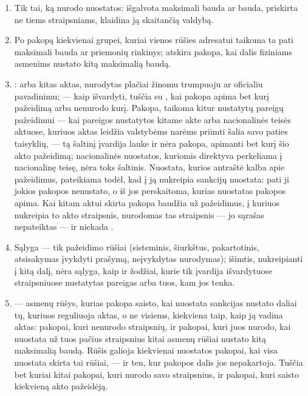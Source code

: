 \begin{enumerate}[itemsep=1pt, topsep=3pt]
  \item Tik tai, ką nurodo nuostatos: išgalvota maksimali bauda ar bauda, priskirta ne tiems
    straipsniams, klaidina ją skaitančią valdybą.
  \item Po pakopą kiekvienai grupei, kuriai vienos rūšies adresatui taikoma ta pati maksimali
    bauda ar priemonių rinkinys; atskira pakopa, kai dalis fiziniams asmenims nustato kitą
    maksimalią baudą.
  \item {}:  arba kitas aktas, nurodytas plačiai žinomu trumpuoju
    ar oficialiu pavadinimu;  --- kaip išvardyti, tuščia su , kai
    pakopa apima bet kurį pažeidimą arba nenurodo kurį. Pakopa, taikoma kitur nustatytų
    pareigų pažeidimui --- kai pareigos nustatytos kitame akte arba nacionalinės teisės aktuose,
    kuriuos aktas leidžia valstybėms narėms priimti šalia savo paties taisyklių, --- tą šaltinį
    įvardija lauke  ir nėra pakopa, apimanti bet kurį šio akto pažeidimą;
    nacionalinės nuostatos, kuriomis direktyva perkeliama į nacionalinę teisę, nėra toks
    šaltinis. Nuostata, kurios antraštė kalba apie pažeidimus, pateikiama todėl, kad į ją
    nukreipia sankcijų nuostata: pati ji jokios pakopos nenustato, o iš jos perskaitoma,
    kurias nuostatas pakopos apima. Kai kitam aktui skirta pakopa baudžia už pažeidimus, į
    kuriuos nukreipia to akto straipsnis, nurodomas tas straipsnis --- jo sąrašas
    nepateiktas --- ir niekada .
  \item Sąlyga --- tik pažeidimo rūšiai (sisteminis, šiurkštus, pakartotinis, atsisakymas
    įvykdyti prašymą, neįvykdytas nurodymas); išimtis, nukreipianti į kitą dalį, nėra sąlyga,
    kaip ir žodžiai, kurie tik įvardija išvardytuose straipsniuose nustatytas pareigas arba
    tuos, kam jos tenka.
  \item {} --- asmenų rūšys, kurias pakopa saisto, kai nuostata sankcijas nustato
    daliai tų, kuriuos reguliuoja aktas, o ne visiems, kiekviena taip, kaip ją vadina aktas:
    pakopai, kuri nenurodo straipsnių, ir pakopai, kuri juos nurodo, kai nuostata už tuos
    pačius straipsnius kitai asmenų rūšiai nustato kitą maksimalią baudą. Rūšis galioja
    kiekvienai nuostatos pakopai, kai visa nuostata skirta tai rūšiai, --- ir ten, kur pakopos
    dalis jos nepakartoja. Tuščia bet kuriai kitai pakopai, kuri nurodo savo straipsnius, ir
    pakopai, kuri saisto kiekvieną akto pažeidėją.

\end{enumerate}
